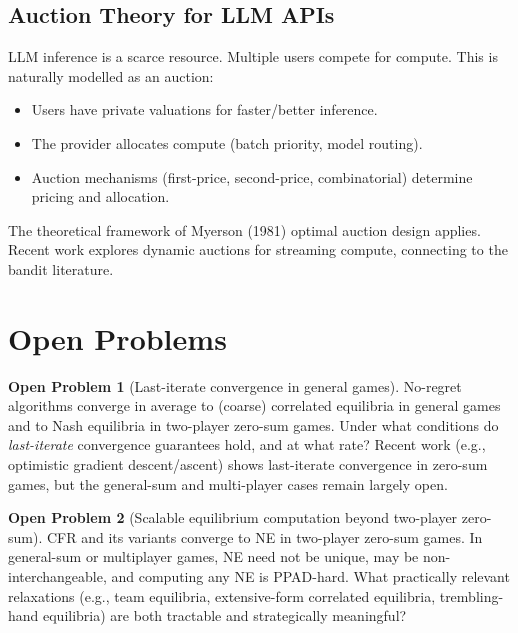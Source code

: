 \documentclass[11pt,a4paper]{article}
\theoremstyle{plain}
\theoremstyle{definition}
\newtheorem{openproblem}{Open Problem}
\begin{document}
\subsection{Auction Theory for LLM APIs}

LLM inference is a scarce resource.  Multiple users compete for compute.
This is naturally modelled as an auction:
\begin{itemize}
  \item Users have private valuations for faster/better inference.
  \item The provider allocates compute (batch priority, model routing).
  \item Auction mechanisms (first-price, second-price, combinatorial)
    determine pricing and allocation.
\end{itemize}
The theoretical framework of Myerson (1981) optimal auction design
applies.  Recent work explores dynamic auctions for streaming compute,
connecting to the bandit literature.

\section{Open Problems}\label{sec:open}

\begin{openproblem}[Last-iterate convergence in general games]
No-regret algorithms converge in average to (coarse) correlated
equilibria in general games and to Nash equilibria in two-player
zero-sum games.  Under what conditions do \emph{last-iterate}
convergence guarantees hold, and at what rate?  Recent work (e.g.,
optimistic gradient descent/ascent) shows last-iterate convergence in
zero-sum games, but the general-sum and multi-player cases remain
largely open.
\end{openproblem}

\begin{openproblem}[Scalable equilibrium computation beyond two-player zero-sum]
CFR and its variants converge to NE in two-player zero-sum games.  In
general-sum or multiplayer games, NE need not be unique, may be
non-interchangeable, and computing any NE is PPAD-hard.  What
practically relevant relaxations (e.g., team equilibria, extensive-form
correlated equilibria, trembling-hand equilibria) are both tractable and
strategically meaningful?
\end{openproblem}
\end{document}
